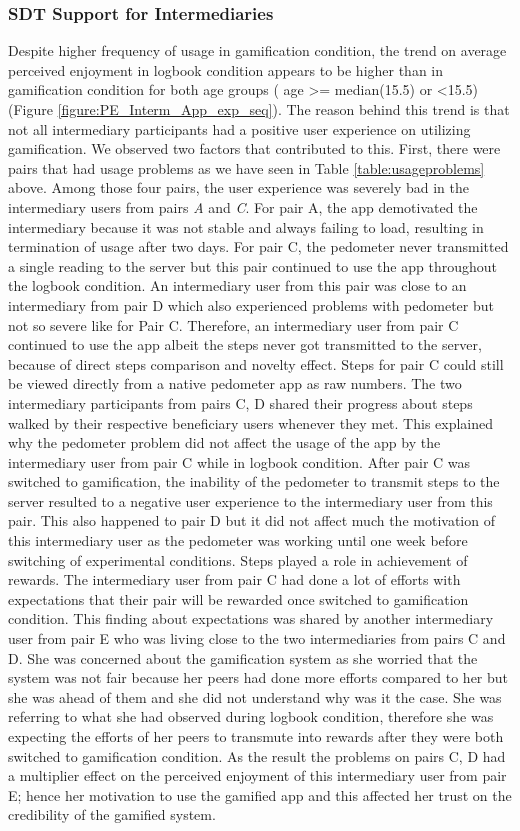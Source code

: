 \documentclass{sig-alternate}
\begin{document}
\subsubsection{{SDT Support for Intermediaries}}  
Despite higher frequency of usage in gamification condition, the trend on average perceived enjoyment in logbook condition appears to be higher than in gamification condition for both age groups ( age \textgreater = median(15.5) or \textless 15.5) (Figure \ref{figure:PE_Interm_App_exp_seq}). The reason behind this trend is that not all intermediary participants had a positive user experience on utilizing gamification. We observed two factors that contributed  to this. First, there were pairs that had usage problems as we have seen in Table \ref{table:usageproblems} above. Among those four pairs, the user experience was severely bad in the intermediary users from pairs \emph{A} and \emph{C}. For pair A, the app demotivated the intermediary because it was not stable and always failing to load, resulting in termination of usage after two days. For pair C, the pedometer never transmitted a single reading to the server but this pair continued to use the app throughout the logbook condition. An intermediary user from this pair was close to an intermediary from pair D which also experienced problems with pedometer but not so severe like for Pair C. Therefore, an intermediary user from pair C continued to use the app albeit the steps never got transmitted to the server, because of direct steps comparison and novelty effect. Steps for pair C could still be viewed directly from a native pedometer app as raw numbers. The two intermediary participants from pairs C, D shared their progress about steps walked by their respective beneficiary users whenever they met. This explained why the pedometer problem did not affect the usage of the app by the intermediary user from pair C while in logbook condition. After pair C was switched to gamification, the inability of the pedometer to transmit steps to the server resulted to a negative user experience to the intermediary user from this pair. This also happened to pair D but it did not affect much the motivation of this intermediary user as the pedometer was working until one week before switching of experimental conditions. Steps played a role in achievement of rewards. The intermediary user from pair C had done a lot of efforts with expectations that their pair will be rewarded once switched to gamification condition. This finding about expectations was shared by another intermediary user from pair E who was living close  to the two intermediaries from pairs C and D. She was concerned about the gamification system as she worried that the system was not fair because her peers had done more efforts compared to her but she was ahead of them and she did not understand why was it the case. She was referring to what she had observed during logbook condition,  therefore she was expecting the efforts of her peers to transmute into rewards after they were both switched to gamification condition. As the result the problems on pairs C, D had a multiplier  effect on the perceived enjoyment of this intermediary user from pair E; hence her motivation to use the gamified app and this affected her trust on the credibility of the gamified system.
\end{document}
